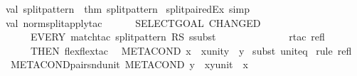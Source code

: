\begin{isabellebody}
val\ split{\isacharunderscore}pattern\ {\isacharequal}\ thm\ {\isachardoublequote}split{\isacharunderscore}pattern{\isachardoublequote}\isanewline
{\isacharverbatimclose}%
\endisatagML
{\isafoldML}%
%
\isadelimML
\isanewline
%
\endisadelimML
\isanewline
{}\isamarkupfalse%
\ split{\isacharunderscore}paired{\isacharunderscore}Ex\ {\isacharbrackleft}simp{\isacharbrackright}\isanewline
\isanewline
%
\isadelimML
\isanewline
%
\endisadelimML
%
\isatagML
{}\isamarkupfalse%
\ {\isacharverbatimopen}\ \isanewline
val\ norm{\isacharunderscore}split{\isacharunderscore}apply{\isacharunderscore}tac\ {\isacharequal}\ \isanewline
\ \ \ \ {\isacharparenleft}SELECT{\isacharunderscore}GOAL\ {\isacharparenleft}CHANGED\ \isanewline
\ \ \ \ \ {\isacharparenleft}EVERY{}\ {\isacharbrackleft}{\isacharparenleft}match{\isacharunderscore}tac\ {\isacharbrackleft}split{\isacharunderscore}pattern\ RS\ ssubst{\isacharbrackright}{\isacharparenright}{\isacharcomma}\isanewline
\ \ \ \ \ \ \ \ \ \ \ \ \ \ {\isacharparenleft}rtac\ refl{\isacharparenright}{\isacharbrackright}{\isacharparenright}\isanewline
\ \ \ \ \ THEN\ flexflex{\isacharunderscore}tac{\isacharparenright}{\isacharparenright}\isanewline
\isanewline
{\isacharverbatimclose}%
\endisatagML
{\isafoldML}%
%
\isadelimML
\isanewline
%
\endisadelimML
\isanewline
\isanewline
\isanewline
\isanewline
\isanewline
{}\isamarkupfalse%
\ \ {\isachardoublequoteopen}METACOND\ x\ {\isacharequal}{\isacharequal}{\isachargreater}\ {\isacharparenleft}{\isacharparenleft}x{\isacharcolon}{\isacharcolon}unit{\isacharparenright}{\isacharcomma}y{\isacharparenright}\ {\isacharequal}\ {\isacharparenleft}{\isacharparenleft}{\isacharparenright}{\isacharcomma}y{\isacharparenright}{\isachardoublequoteclose}\isanewline
%
\isadelimproof
%
\endisadelimproof
%
\isatagproof
{}\isamarkupfalse%
\ {\isacharparenleft}subst\ unit{\isacharunderscore}eq{\isacharparenright}\isanewline
{}\isamarkupfalse%
\ {\isacharparenleft}rule\ refl{\isacharparenright}\isanewline
{}\isamarkupfalse%
%
\endisatagproof
{\isafoldproof}%
%
\isadelimproof
\isanewline
%
\endisadelimproof
\isanewline
{}\isamarkupfalse%
\ METACOND{\isacharunderscore}pair{\isacharunderscore}snd{\isacharunderscore}unit{\isacharcolon}\ {\isachardoublequoteopen}METACOND\ y\ {\isacharequal}{\isacharequal}{\isachargreater}\ {\isacharparenleft}x{\isacharcomma}{\isacharparenleft}y{\isacharcolon}{\isacharcolon}unit{\isacharparenright}{\isacharparenright}\ {\isacharequal}\ {\isacharparenleft}x{\isacharcomma}{\isacharparenleft}{\isacharparenright}{\isacharparenright}{\isachardoublequoteclose}\isanewline

\end{isabellebody}
